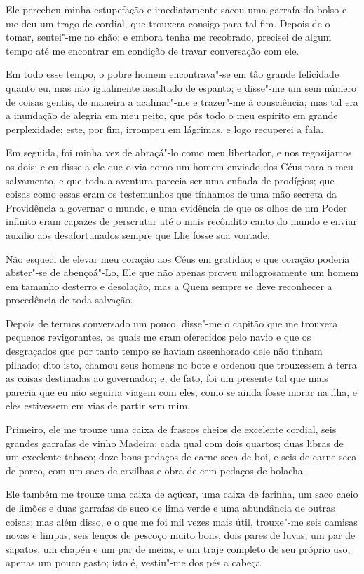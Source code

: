 Ele percebeu minha estupefação e imediatamente sacou uma garrafa do
bolso e me deu um trago de cordial, que trouxera consigo para tal fim.
Depois de o tomar, sentei"-me no chão; e embora tenha me recobrado,
precisei de algum tempo até me encontrar em condição de travar
conversação com ele.

Em todo esse tempo, o pobre homem encontrava"-se em tão grande felicidade
quanto eu, mas não igualmente assaltado de espanto; e disse"-me um sem
número de coisas gentis, de maneira a acalmar"-me e trazer"-me à
consciência; mas tal era a inundação de alegria em meu peito, que pôs
todo o meu espírito em grande perplexidade; este, por fim, irrompeu em
lágrimas, e logo recuperei a fala.

Em seguida, foi minha vez de abraçá"-lo como meu libertador, e nos
regozijamos os dois; e eu disse a ele que o via como um homem enviado
dos Céus para o meu salvamento, e que toda a aventura parecia ser uma
enfiada de prodígios; que coisas como essas eram os testemunhos que
tínhamos de uma mão secreta da Providência a governar o mundo, e uma
evidência de que os olhos de um Poder infinito eram capazes de
perscrutar até o mais recôndito canto do mundo e enviar auxilio aos
desafortunados sempre que Lhe fosse sua vontade.

Não esqueci de elevar meu coração aos Céus em gratidão; e que coração
poderia abster"-se de abençoá"-Lo, Ele que não apenas proveu
milagrosamente um homem em tamanho desterro e desolação, mas a Quem
sempre se deve reconhecer a procedência de toda salvação.

Depois de termos conversado um pouco, disse"-me o capitão que me trouxera
pequenos revigorantes, os quais me eram oferecidos pelo navio e que os
desgraçados que por tanto tempo se haviam assenhorado dele não tinham
pilhado; dito isto, chamou seus homens no bote e ordenou que trouxessem
à terra as coisas destinadas ao governador; e, de fato, foi um presente
tal que mais parecia que eu não seguiria viagem com eles, como se ainda
fosse morar na ilha, e eles estivessem em vias de partir sem mim.

Primeiro, ele me trouxe uma caixa de frascos cheios de excelente
cordial, seis grandes garrafas de vinho Madeira; cada qual com dois
quartos; duas libras de um excelente tabaco; doze bons pedaços de carne
seca de boi, e seis de carne seca de porco, com um saco de ervilhas e
obra de cem pedaços de bolacha.

Ele também me trouxe uma caixa de açúcar, uma caixa de farinha, um saco
cheio de limões e duas garrafas de suco de lima verde e uma abundância
de outras coisas; mas além disso, e o que me foi mil vezes mais útil,
trouxe"-me seis camisas novas e limpas, seis lenços de pescoço muito
bons, dois pares de luvas, um par de sapatos, um chapéu e um par de
meias, e um traje completo de seu próprio uso, apenas um pouco gasto;
isto é, vestiu"-me dos pés a cabeça.

